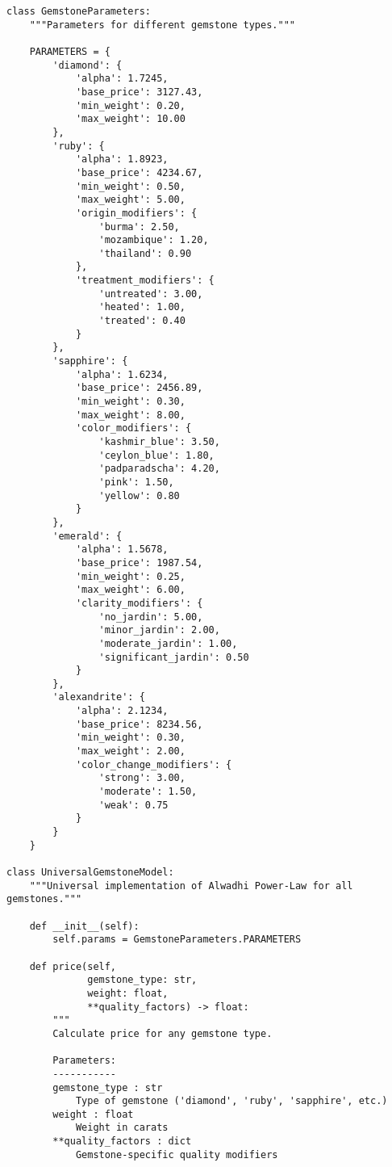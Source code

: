 \begin{lstlisting}[caption={Multi-Gemstone Power-Law Implementation}]
class GemstoneParameters:
    """Parameters for different gemstone types."""
    
    PARAMETERS = {
        'diamond': {
            'alpha': 1.7245,
            'base_price': 3127.43,
            'min_weight': 0.20,
            'max_weight': 10.00
        },
        'ruby': {
            'alpha': 1.8923,
            'base_price': 4234.67,
            'min_weight': 0.50,
            'max_weight': 5.00,
            'origin_modifiers': {
                'burma': 2.50,
                'mozambique': 1.20,
                'thailand': 0.90
            },
            'treatment_modifiers': {
                'untreated': 3.00,
                'heated': 1.00,
                'treated': 0.40
            }
        },
        'sapphire': {
            'alpha': 1.6234,
            'base_price': 2456.89,
            'min_weight': 0.30,
            'max_weight': 8.00,
            'color_modifiers': {
                'kashmir_blue': 3.50,
                'ceylon_blue': 1.80,
                'padparadscha': 4.20,
                'pink': 1.50,
                'yellow': 0.80
            }
        },
        'emerald': {
            'alpha': 1.5678,
            'base_price': 1987.54,
            'min_weight': 0.25,
            'max_weight': 6.00,
            'clarity_modifiers': {
                'no_jardin': 5.00,
                'minor_jardin': 2.00,
                'moderate_jardin': 1.00,
                'significant_jardin': 0.50
            }
        },
        'alexandrite': {
            'alpha': 2.1234,
            'base_price': 8234.56,
            'min_weight': 0.30,
            'max_weight': 2.00,
            'color_change_modifiers': {
                'strong': 3.00,
                'moderate': 1.50,
                'weak': 0.75
            }
        }
    }

class UniversalGemstoneModel:
    """Universal implementation of Alwadhi Power-Law for all gemstones."""
    
    def __init__(self):
        self.params = GemstoneParameters.PARAMETERS
    
    def price(self, 
              gemstone_type: str,
              weight: float,
              **quality_factors) -> float:
        """
        Calculate price for any gemstone type.
        
        Parameters:
        -----------
        gemstone_type : str
            Type of gemstone ('diamond', 'ruby', 'sapphire', etc.)
        weight : float
            Weight in carats
        **quality_factors : dict
            Gemstone-specific quality modifiers
            

\end{lstlisting}
